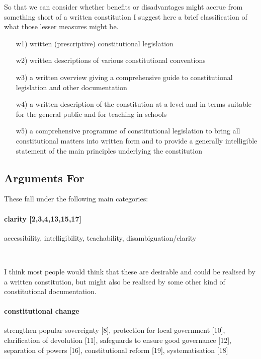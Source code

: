 \documentclass[14pt,titlepage]{extarticle}
\begin{document}
So that we can consider whether benefits or disadvantages might accrue from something short of a written constitution I suggest here a brief classification of what those lesser measures might be.

\begin{itemize}
\item[w1)] written (prescriptive) constitutional legislation
\item[w2)] written descriptions of various constitutional conventions
\item[w3)] a written overview giving a comprehensive guide to constitutional legislation and other documentation
\item[w4)] a written description of the constitution at a level and in terms suitable for the general public and for teaching in schools
\item[w5)] a comprehensive programme of constitutional legislation to bring all constitutional matters into written form and to provide a generally intelligible statement of the main principles underlying the constitution
\end{itemize}

\subsection{Arguments For}

These fall under the following main categories:


\paragraph{clarity [2,3,4,13,15,17]}  

  accessibility, intelligibility, teachability, disambiguation/clarity

\ 
  
  I think most people would think that these are desirable and could be realised by a written constitution, but might also be realised by some other kind of constitutional documentation.

\paragraph{constitutional change}

strengthen popular sovereignty [8], protection for local government [10], clarification of devolution [11], safeguards to ensure good governance [12], separation of powers [16], constitutional reform [19], systematisation [18]
\end{document}
